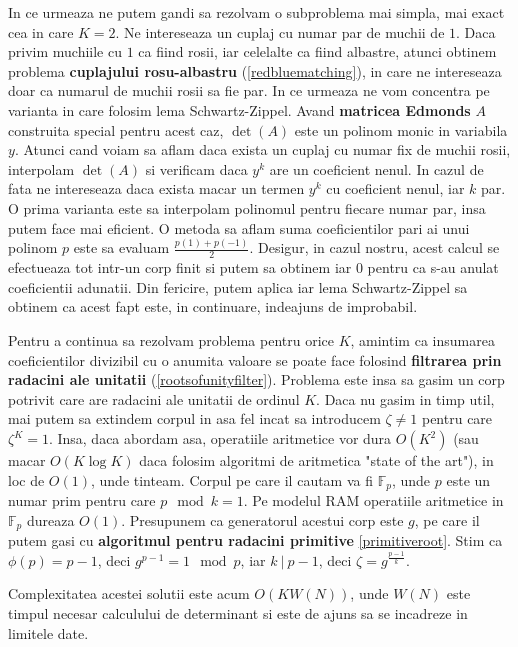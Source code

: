 \pagebreak

In ce urmeaza ne putem gandi sa rezolvam o subproblema mai simpla, mai exact cea in care $K=2$.
Ne intereseaza un cuplaj cu numar par de muchii de $1$. Daca privim muchiile cu $1$ ca fiind
rosii, iar celelalte ca fiind albastre, atunci obtinem problema \textbf{cuplajului rosu-albastru} (\ref{redbluematching}),
in care ne intereseaza doar ca numarul de muchii rosii sa fie par. In ce urmeaza ne vom concentra pe varianta
in care folosim lema Schwartz-Zippel. Avand \textbf{matricea Edmonds} $A$ construita special pentru acest caz,
$\det(A)$ este un polinom monic in variabila $y$. Atunci cand voiam sa aflam daca exista un cuplaj cu numar
fix de muchii rosii, interpolam $\det(A)$ si verificam daca $y^{k}$ are un coeficient nenul. In cazul de fata
ne intereseaza daca exista macar un termen $y^{k}$ cu coeficient nenul, iar $k$ par. O prima varianta este sa
interpolam polinomul pentru fiecare numar par, insa putem face mai eficient. O metoda sa aflam suma coeficientilor
pari ai unui polinom $p$ este sa evaluam $\frac{p(1) + p(-1)}{2}$. Desigur, in cazul nostru, acest calcul se
efectueaza tot intr-un corp finit si putem sa obtinem iar $0$ pentru ca s-au anulat coeficientii adunatii.
Din fericire, putem aplica iar lema Schwartz-Zippel sa obtinem ca acest fapt este, in continuare, indeajuns
de improbabil.

Pentru a continua sa rezolvam problema pentru orice $K$, amintim ca insumarea coeficientilor divizibil cu o anumita valoare
se poate face folosind \textbf{filtrarea prin radacini ale unitatii} (\ref{rootsofunityfilter}). Problema este insa
sa gasim un corp potrivit care are radacini ale unitatii de ordinul $K$. Daca nu gasim in timp util, mai putem sa extindem
corpul in asa fel incat sa introducem $\zeta \neq 1$ pentru care $\zeta^{K} = 1$. Insa, daca abordam asa, operatiile
aritmetice vor dura $O(K^{2})$ (sau macar $O(K \log K)$ daca folosim algoritmi de aritmetica "state of the art"),
in loc de $O(1)$, unde tinteam. Corpul pe care il cautam va fi $\mathbb{F}_{p}$, unde $p$ este un numar prim pentru care
$p \mod k = 1$. Pe modelul RAM operatiile aritmetice in $\mathbb{F}_{p}$ dureaza $O(1)$. Presupunem ca generatorul acestui
corp este $g$, pe care il putem gasi cu \textbf{algoritmul pentru radacini primitive} \ref{primitiveroot}. Stim ca
$\phi(p) = p - 1$, deci $g^{p - 1} = 1 \mod p$, iar $k\ |\ p - 1$, deci $\zeta = g^{\frac{p-1}{k}}$.

Complexitatea acestei solutii este acum $O(K W(N))$, unde $W(N)$ este timpul necesar calculului de determinant si este
de ajuns sa se incadreze in limitele date.

